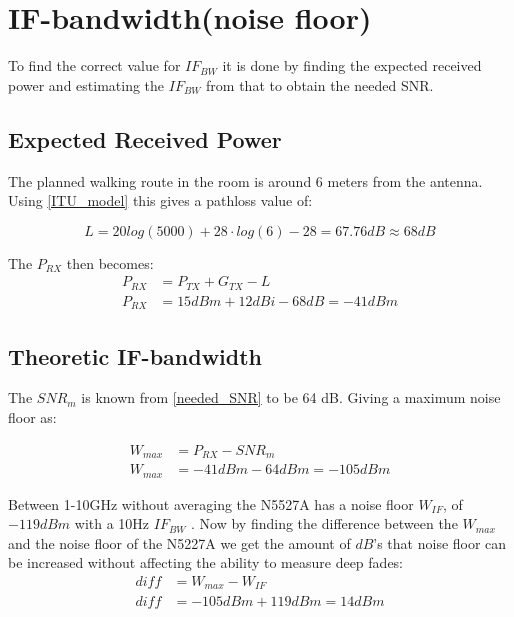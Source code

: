 


\section{IF-bandwidth(noise floor)}
To find the correct value for $IF_{BW}$ it is done by finding the expected received power and estimating the $IF_{BW}$ from that to obtain the needed SNR. 

\subsection{Expected Received Power}
The planned walking route in the room is around 6 meters from the antenna. Using \autoref{ITU_model} this gives a pathloss value of:

\begin{equation}
L = 20log (5000) + 28 \cdot log(6)-28 = 67.76dB \approx 68dB
\label{eq:path_loss}
\end{equation}

The $P_{RX}$ then becomes:
\begin{align}
P_{RX} &= P_{TX} + G_{TX} - L \\
P_{RX} &= 15dBm + 12dBi - 68dB = -41dBm
\label{NFvna}
\end{align}
\begin{where}
\end{where}


\subsection{Theoretic IF-bandwidth}

The $SNR_m$ is known from \autoref{needed_SNR} to be 64 dB. Giving a maximum noise floor as:

\begin{align}
W_{max} &= P_{RX}-SNR_m\\
W_{max} &= -41 dBm -64 dBm = -105 dBm
\end{align}
\begin{where}
\end{where}

Between 1-10GHz without averaging the N5527A has a noise floor $W_{IF}$, of $-119dBm$ with a 10Hz $IF_{BW}$ \citep{Key_PNA}. Now by finding the difference between the $W_{max}$ and the noise floor of the N5227A we get the amount of $dB$'s that noise floor can be increased without affecting the ability to measure deep fades:
\begin{align}
diff &= W_{max}-W_{IF}\\
diff &= -105dBm+119dBm = 14dBm 
\end{align}


